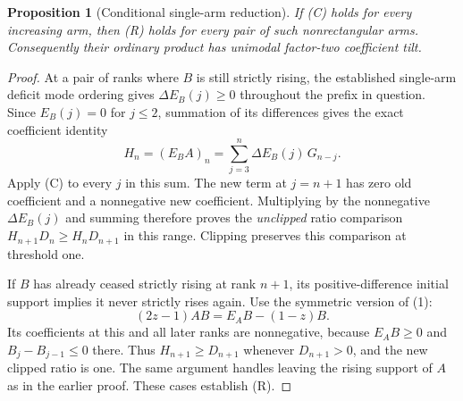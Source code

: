 \documentclass[11pt]{article}
\newtheorem{proposition}{Proposition}[section]
\begin{document}
\begin{proposition}[Conditional single-arm reduction]
If (C) holds for every increasing arm, then (R) holds for
every pair of such nonrectangular arms. Consequently their
ordinary product has unimodal factor-two coefficient tilt.
\end{proposition}
\begin{proof}
At a pair of ranks where $B$ is still strictly rising,
the established single-arm deficit mode ordering gives
$\Delta E_B(j)\ge0$ throughout the prefix in question.
Since $E_B(j)=0$ for $j\le2$, summation of its differences
gives the exact coefficient identity
\[
 H_n=(E_B A)_n
       =\sum_{j=3}^{n}\Delta E_B(j)\,G_{n-j}.
                                                        \tag{2}
\]
Apply (C) to every $j$ in this sum. The new term at $j=n+1$
has zero old coefficient and a nonnegative new coefficient.
Multiplying by the nonnegative $\Delta E_B(j)$ and summing
therefore proves the \emph{unclipped} ratio comparison
$H_{n+1}D_n\ge H_nD_{n+1}$ in this range. Clipping preserves
this comparison at threshold one.

If $B$ has already ceased strictly rising at rank $n+1$,
its positive-difference initial support implies it never
strictly rises again. Use the symmetric version of (1):
\[
 (2z-1)AB=E_A B-(1-z)B.
\]
Its coefficients at this and all later ranks are nonnegative,
because $E_A B\ge0$ and $B_j-B_{j-1}\le0$ there.
Thus $H_{n+1}\ge D_{n+1}$ whenever $D_{n+1}>0$, and
the new clipped ratio is one. The same argument handles
leaving the rising support of $A$ as in the earlier proof.
These cases establish (R).
\end{proof}

\par\medskip
\end{document}
